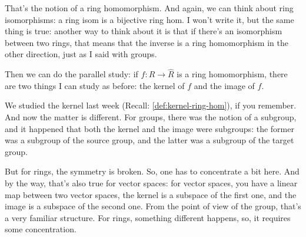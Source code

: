\begin{speech}[00:31:07 - 00:32:57]
That's the notion of a ring homomorphism. And again, we can think about ring isomorphisms: a ring isom is a bijective ring hom.  I won't write it, but the same thing is true: another way to think about it is that if there's an isomorphism between two rings, that means that the inverse is a ring homomorphism in the other direction, just as I said with groups.

Then we can do the parallel study: if $f \colon R \to \hat{R}$ is a ring homomorphism,  there are two things I can study as before: the kernel of $f$ and the image of $f$. 

We studied the kernel last week (Recall: \cref{def:kernel-ring-hom}), if you remember. And now the matter is different. For groups, there was the notion of a subgroup, and it happened that both the kernel and the image were subgroups: the former was a subgroup of the source group, and the latter was a subgroup of the target group.

But for rings, the symmetry is broken. So, one has to concentrate a bit here. And by the way, that's also true for vector spaces: for vector spaces, you have a linear map between two vector spaces, the kernel is a subspace of the first one, and the image is a subspace of the second one. From the point of view of the group, that's a very familiar structure. For rings, something different happens, so, it requires some concentration.
\end{speech}

